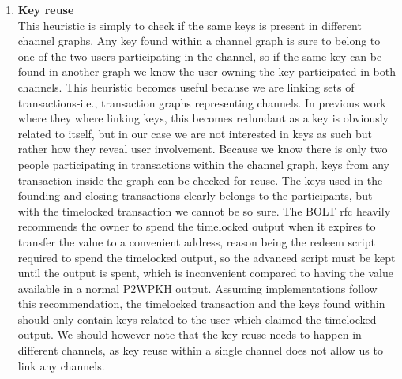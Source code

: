 \begin{enumerate}

    \item \textbf{Key reuse}\\
This heuristic is simply to check if the same keys is present in different channel graphs.  
Any key found within a channel graph is sure to belong to one of the two users participating in the channel, so if the same key can be found in another graph we know the user owning the key participated in both channels.
This heuristic becomes useful because we are linking sets of transactions-i.e., transaction graphs representing channels. In previous work where they where linking keys, this becomes redundant as a key is obviously related to itself, but in our case we are not interested in keys as such but rather how they reveal user involvement. Because we know there is only two people participating in transactions within the channel graph, keys from any transaction inside the graph can be checked for reuse. The keys used in the founding and closing transactions clearly belongs to the participants, but with the timelocked transaction we cannot be so sure. The BOLT rfc \cite{bolt5} heavily recommends the owner to spend the timelocked output when it expires to transfer the value to a convenient address, reason being the redeem script required to spend the timelocked output, so the advanced script must be kept until the output is spent, which is inconvenient compared to having the value available in a normal P2WPKH output.
Assuming implementations follow this recommendation, the timelocked transaction and the keys found within should only contain keys related to the user which claimed the timelocked output. We should however note that the key reuse needs to happen in different channels, as key reuse within a single channel does not allow us to link any channels.
\\


\end{enumerate}
